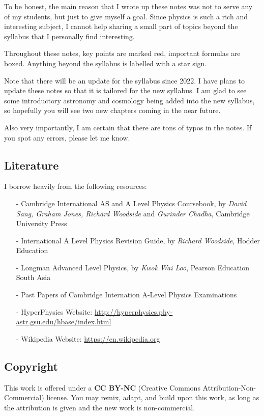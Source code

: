 To be honest, the main reason that I wrote up these notes was not to serve any of my students, but just to give myself a goal. Since physics is such a rich and interesting subject, I cannot help sharing a small part of topics beyond the syllabus that I personally find interesting.

Throughout these notes, key points are marked red, important formulas are boxed. Anything beyond the syllabus is labelled with a star sign.

Note that there will be an update for the syllabus since 2022. I have plans to update these notes so that it is tailored for the new syllabus. I am glad to see some introductory astronomy and cosmology being added into the new syllabus, so hopefully you will see two new chapters coming in the near future.

Also very importantly, I am certain that there are tons of typos in the notes. If you spot any errors, please let me know.


\subsection*{Literature}

I borrow heavily from the following resources:

\begin{itemize}
\item[-] Cambridge International AS and A Level Physics Coursebook, by \textit{David Sang, Graham Jones, Richard Woodside} and \textit{Gurinder Chadha}, Cambridge University Press

\item[-] International A Level Physics Revision Guide, by \textit{Richard Woodside}, Hodder Education

\item[-] Longman Advanced Level Physics, by \textit{Kwok Wai Loo},	Pearson Education South Asia

\item[-] Past Papers of Cambridge Internation A-Level Physics Examinations

\item[-] HyperPhysics Website: \url{http://hyperphysics.phy-astr.gsu.edu/hbase/index.html}

\item[-] Wikipedia Website: \url{https://en.wikipedia.org}
\end{itemize}

\subsection*{Copyright}

This work is offered under a \textbf{CC BY-NC} (Creative Commons Attribution-Non-Commercial) license. You may remix, adapt, and build upon this work, as long as the attribution is given and the new work is non-commercial.